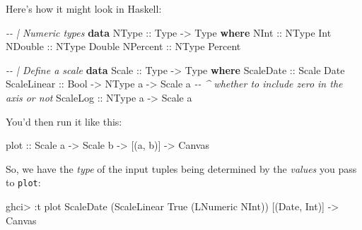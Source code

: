 \documentclass[]{article}
\newenvironment{Shaded}{}{}
\newcommand{\CommentTok}[1]{\textcolor[rgb]{0.38,0.63,0.69}{\textit{#1}}}
\newcommand{\DataTypeTok}[1]{\textcolor[rgb]{0.56,0.13,0.00}{#1}}
\newcommand{\KeywordTok}[1]{\textcolor[rgb]{0.00,0.44,0.13}{\textbf{#1}}}
\newcommand{\NormalTok}[1]{#1}
\newcommand{\OperatorTok}[1]{\textcolor[rgb]{0.40,0.40,0.40}{#1}}
\newcommand{\OtherTok}[1]{\textcolor[rgb]{0.00,0.44,0.13}{#1}}
\begin{document}
Here's how it might look in Haskell:

\begin{Shaded}
\begin{Highlighting}[]
\CommentTok{{-}{-} | Numeric types}
\KeywordTok{data} \DataTypeTok{NType}\OtherTok{ ::} \DataTypeTok{Type} \OtherTok{{-}\textgreater{}} \DataTypeTok{Type} \KeywordTok{where}
    \DataTypeTok{NInt}\OtherTok{ ::} \DataTypeTok{NType} \DataTypeTok{Int}
    \DataTypeTok{NDouble}\OtherTok{ ::} \DataTypeTok{NType} \DataTypeTok{Double}
    \DataTypeTok{NPercent}\OtherTok{ ::} \DataTypeTok{NType} \DataTypeTok{Percent}

\CommentTok{{-}{-} | Define a scale}
\KeywordTok{data} \DataTypeTok{Scale}\OtherTok{ ::} \DataTypeTok{Type} \OtherTok{{-}\textgreater{}} \DataTypeTok{Type} \KeywordTok{where}
    \DataTypeTok{ScaleDate}\OtherTok{ ::} \DataTypeTok{Scale} \DataTypeTok{Date}
    \DataTypeTok{ScaleLinear}\OtherTok{ ::} \DataTypeTok{Bool} \OtherTok{{-}\textgreater{}} \DataTypeTok{NType}\NormalTok{ a }\OtherTok{{-}\textgreater{}} \DataTypeTok{Scale}\NormalTok{ a   }\CommentTok{{-}{-} \^{} whether to include zero in the axis or not}
    \DataTypeTok{ScaleLog}\OtherTok{ ::} \DataTypeTok{NType}\NormalTok{ a }\OtherTok{{-}\textgreater{}} \DataTypeTok{Scale}\NormalTok{ a}
\end{Highlighting}
\end{Shaded}

You'd then run it like this:

\begin{Shaded}
\begin{Highlighting}[]
\OtherTok{plot ::} \DataTypeTok{Scale}\NormalTok{ a }\OtherTok{{-}\textgreater{}} \DataTypeTok{Scale}\NormalTok{ b }\OtherTok{{-}\textgreater{}}\NormalTok{ [(a, b)] }\OtherTok{{-}\textgreater{}} \DataTypeTok{Canvas}
\end{Highlighting}
\end{Shaded}

So, we have the \emph{type} of the input tuples being determined by the
\emph{values} you pass to \texttt{plot}:

\begin{Shaded}
\begin{Highlighting}[]
\NormalTok{ghci}\OperatorTok{\textgreater{}} \OperatorTok{:}\NormalTok{t plot }\DataTypeTok{ScaleDate}\NormalTok{ (}\DataTypeTok{ScaleLinear} \DataTypeTok{True}\NormalTok{ (}\DataTypeTok{LNumeric} \DataTypeTok{NInt}\NormalTok{))}
\NormalTok{[(}\DataTypeTok{Date}\NormalTok{, }\DataTypeTok{Int}\NormalTok{)] }\OtherTok{{-}\textgreater{}} \DataTypeTok{Canvas}
\end{Highlighting}
\end{Shaded}
\end{document}
